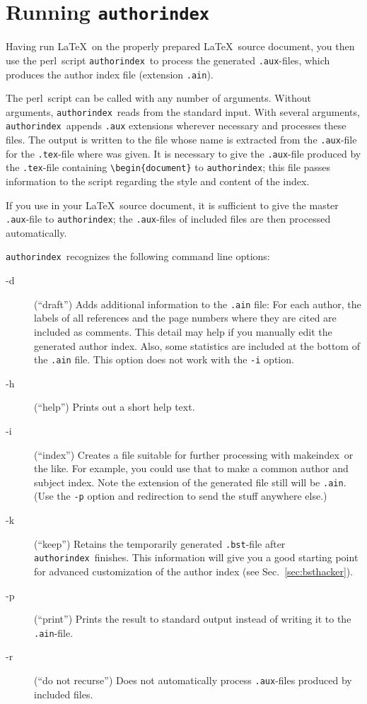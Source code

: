 \documentclass[a4paper]{article}
\newcommand{\package}[1]{\textsf{#1}}
\newcommand{\mkindex}{\package{makeindex}}
\newcommand{\perl}{\textsf{perl}}
\newcommand{\file}[1]{\texttt{#1}}
\newcommand{\fnext}[1]{\file{.#1}}
\newcommand{\cmdline}[1]{\texttt{#1}}
\newcommand{\option}[1]{\cmdline{#1}}
\newcommand{\aiperl}{\cmdline{authorindex}}
\newcommand{\ltxinp}[1]{\texttt{\string#1}}
\begin{document}
\section{Running \aiperl}
\label{sec:Runai}

Having run \LaTeX\ on the properly prepared \LaTeX\ source document, you then
use the \perl\ script \aiperl\ to process the generated \fnext{aux}-files,
which produces the author index file (extension \fnext{ain}).

The \perl\ script can be called with any number of arguments.  Without
arguments, \aiperl\ reads from the standard input. With several arguments,
\aiperl\ appends \fnext{aux} extensions wherever necessary and processes these
files. The output is written to the file whose name is extracted from the
\fnext{aux}-file for the \fnext{tex}-file where \ltxinp{\printauthorindex} was
given. It is necessary to give the \fnext{aux}-file produced by the
\fnext{tex}-file containing \verb|\begin{document}| to \aiperl; this file
  passes information to the script regarding the style and content of the
  index.
  
If you use \ltxinp{} in your \LaTeX\ source document, it is
sufficient to give the master \fnext{aux}-file to \aiperl; the
\fnext{aux}-files of included files are then processed automatically.

\aiperl\ recognizes the following command line options:
\begin{description}
\item[-d] (``draft'') Adds additional information to the \fnext{ain} file: For
  each author, the labels of all references and the page numbers where they are
  cited are included as comments. This detail may help if you manually edit the
  generated author index. Also, some statistics are included at the bottom of
  the \fnext{ain} file. This option does not work with the \option{-i} option.
\item[-h] (``help'') Prints out a
  short help text.
\item[-i] (``index'') Creates a file suitable for further processing with
  \mkindex\ or the like. For example, you could use that to make a common
  author and subject index. Note the extension of the generated file still will
  be \fnext{ain}.  (Use the \option{-p} option and redirection to send the
  stuff anywhere else.)
\item[-k] (``keep'') Retains the temporarily generated \fnext{bst}-file after
  \aiperl\ finishes. This information will give you a good starting point for
  advanced customization of the author index (see Sec.~\ref{sec:bsthacker}).
\item[-p] (``print'') Prints the result to standard output instead of writing
  it to the \fnext{ain}-file.
\item[-r] (``do not recurse'') Does not automatically process \fnext{aux}-files
  produced by included files.
\end{description}
\end{document}
